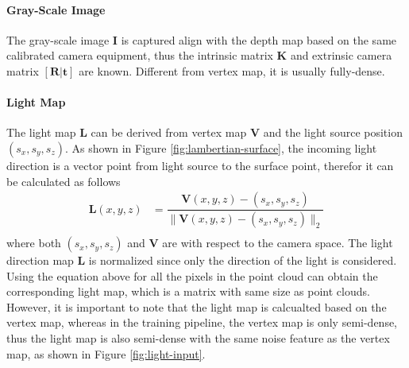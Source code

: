 \paragraph{Gray-Scale Image}
The gray-scale image $ \textbf{I} $ is captured align with the depth map based on the same calibrated camera equipment, thus the intrinsic matrix $ \textbf{K} $ and extrinsic camera matrix $ [\textbf{R}|\textbf{t}] $ are known. Different from vertex map, it is usually fully-dense.

\paragraph{Light Map}
The light map $ \textbf{L} $ can be derived from vertex map $ \textbf{V} $ and the light source position $ (s_x, s_y, s_z) $. As shown in Figure \ref{fig:lambertian-surface}, the incoming light direction is a vector point from light source to the surface point, therefor it can be calculated as follows
\begin{equation}\label{light-direction}
	\begin{array}{ll}
		\textbf{L}(x,y,z)&= \dfrac{\textbf{V}(x,y,z)-(s_x,s_y, s_z)}{\|\textbf{V}(x,y,z)-(s_x,s_y, s_z)\|_2}\\ 
	\end{array}
\end{equation}
where both $  (s_x,s_y, s_z) $ and  $ \textbf{V} $ are with respect to the camera space. The light direction map $ \textbf{L} $ is normalized since only the direction of the light is considered. Using the equation above for all the pixels in the point cloud can obtain the corresponding light map, which is a matrix with same size as point clouds. However, it is important to note that the light map is calcualted based on the vertex map, whereas in the training pipeline, the vertex map is only semi-dense, thus the light map is also semi-dense with the same noise feature as the vertex map, as shown in Figure \ref{fig:light-input}. 

